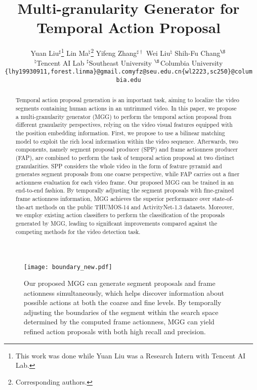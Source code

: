 \documentclass[10pt,twocolumn,letterpaper]{article}
\begin{document}
\title{Multi-granularity Generator for Temporal Action Proposal}
\date{}
\author{Yuan Liu$^\sharp$\thanks{This work was done while Yuan Liu was a Research Intern with Tencent AI Lab. } \qquad
Lin Ma$^\natural$\thanks{Corresponding authors.}\qquad
Yifeng Zhang$^{\sharp\dagger}$ \qquad
Wei Liu$^\natural$ \qquad
Shih-Fu Chang$^\S$ \\
$^\natural$Tencent AI Lab \qquad $^\sharp$Southeast University \qquad $^\S$Columbia University\\ 
{\tt\small \{lhy19930911,forest.linma\}@gmail.com\qquad yfz@seu.edu.cn\qquad  \{wl2223,sc250\}@columbia.edu}
}
\maketitle

\begin{abstract}
Temporal action proposal generation is an important task, aiming to localize the video segments containing human actions in an untrimmed video.
In this paper, we propose a multi-granularity generator (MGG) to perform the temporal action proposal from different granularity perspectives, relying on the video visual features equipped with the position embedding information. First, we propose to use a bilinear matching model to exploit the rich local information within the video sequence. Afterwards, two components, namely  segment proposal producer (SPP) and  frame actionness producer (FAP), are combined to perform the task of temporal action proposal at two distinct granularities. SPP considers the whole video in the form of feature pyramid and generates segment proposals from one coarse perspective, while FAP carries out a finer actionness evaluation for each video frame. Our proposed MGG can be trained in an end-to-end fashion. By temporally adjusting the segment proposals with fine-grained frame actionness information, MGG achieves  the superior performance over state-of-the-art methods on the public THUMOS-14 and
ActivityNet-1.3 datasets. Moreover, we employ existing action classifiers to perform the classification of the proposals generated by MGG, leading to significant improvements compared against the competing methods for the video detection task.
\end{abstract}

\begin{figure}[htbp]
\centering
\texttt{[image: boundary\_new.pdf]}
\caption{
Our proposed MGG can generate segment proposals and frame actionness simultaneously, which  helps discover information about possible actions at both the coarse and fine levels. By temporally adjusting the boundaries of the segment within the search space determined by the computed frame actionness, MGG can  yield refined action proposals with both high recall and precision.
 } 
 \label{boundary}
\end{figure} 
\end{document}
